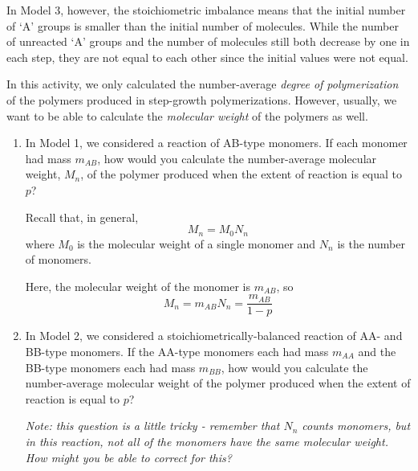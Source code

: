 \begin{activity}
\begin{exercises}
\begin{solution}
				In Model 3, however, the stoichiometric imbalance means that the initial number of `A' groups is smaller than the initial number of molecules.
				While the number of unreacted `A' groups and the number of molecules still both decrease by one in each step, they are not equal to each other since the initial values were not equal.
				
			\end{solution}
	
		\exercise In this activity, we only calculated the number-average \emph{degree of polymerization} of the polymers produced in step-growth polymerizations. However, usually, we want to be able to calculate the \emph{molecular weight} of the polymers as well.
		
			\begin{enumerate}
			
				\item In Model 1, we considered a reaction of AB-type monomers.  If each monomer had mass $m_{AB}$, how would you calculate the number-average molecular weight, $M_n$, of the polymer produced when the extent of reaction is equal to $p$?
				
					\begin{solution}
						Recall that, in general,
						\begin{equation*}
							M_n = M_0 N_n
						\end{equation*}
						where $M_0$ is the molecular weight of a single monomer and $N_n$ is the number of monomers.
						
						Here, the molecular weight of the monomer is $m_{AB}$, so
						\begin{equation*}
							M_n = m_{AB} N_n = \frac{m_{AB}}{1-p}
						\end{equation*}
					\end{solution}
				
				\item In Model 2, we considered a stoichiometrically-balanced reaction of AA- and BB-type monomers. If the AA-type monomers each had mass $m_{AA}$ and the BB-type monomers each had mass $m_{BB}$, how would you calculate the number-average molecular weight of the polymer produced when the extent of reaction is equal to $p$?
				
					\emph{Note: this question is a little tricky - remember that $N_n$ counts \emph{monomers}, but in this reaction, not all of the monomers have the same molecular weight.  How might you be able to correct for this?}
					

\end{enumerate}
\end{exercises}
\end{activity}
